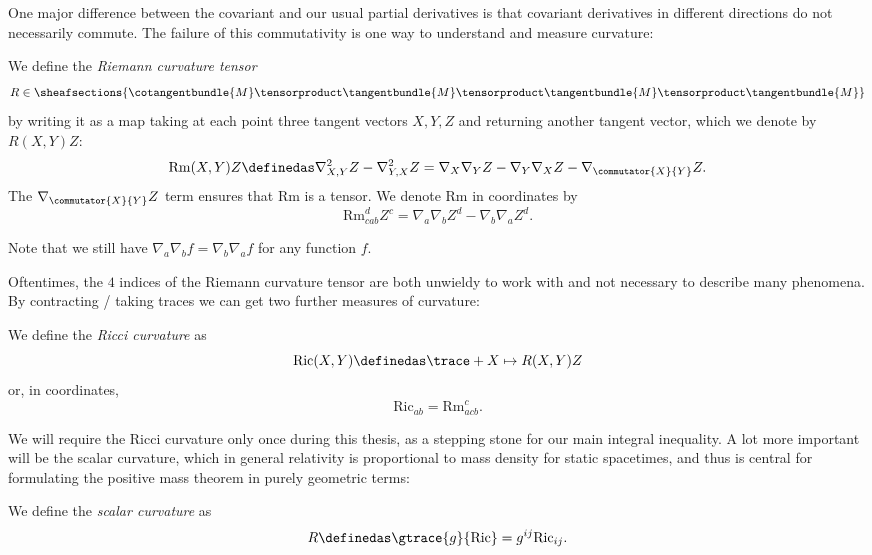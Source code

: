 \documentclass[titlepage,numbers=noenddot,oneside,%
cleardoublepage=empty,paper=a4,fontsize=11pt,%
english,%
]{scrartcl}
\newcommand{\Ricci}{\mathrm{Ric}} %
\newcommand{\riemanncurvature}{\mathrm{Rm}} %
\begin{document}
One major difference between the covariant and our usual partial derivatives is that covariant derivatives in different directions do not necessarily commute. The failure of this commutativity is one way to understand and measure curvature:
\begin{definition}\label{def:riemann_curvature_tensor}
    We define the \emph{Riemann curvature tensor} 
    \begin{equation*}
        R\in \sheafsections{\cotangentbundle{M}\tensorproduct \tangentbundle{M}\tensorproduct \tangentbundle{M}\tensorproduct \tangentbundle{M}}
    \end{equation*} 
    by writing it as a map taking at each point three tangent vectors \( X,Y,Z \) and returning another tangent vector, which we denote by \( R(X,Y)Z \):
    \begin{equation*}
        \riemanncurvature(X,Y)Z\definedas \nabla^2_{X,Y}Z-\nabla^2_{Y,X}Z=\nabla_X \nabla_Y Z- \nabla_Y \nabla_X Z -\nabla_{\commutator{X}{Y}}Z.
    \end{equation*}
    The \( \nabla_{\commutator{X}{Y}}Z \) term ensures that \(  \riemanncurvature \) is a tensor. We denote \(  \riemanncurvature \) in coordinates by
    \begin{equation*}
        \riemanncurvature^d_{cab}Z^c=\nabla_a \nabla_b Z^d-\nabla_b \nabla_a Z^d.
    \end{equation*}
\end{definition}
\begin{remark}\label{rem:second_derivatives_function_commute}
    Note that we still have \( \nabla_a \nabla_b f=\nabla_b \nabla_a f \) for any function \( f \).
\end{remark}
Oftentimes, the \( 4 \) indices of the Riemann curvature tensor are both unwieldy to work with and not necessary to describe many phenomena. By contracting / taking traces we can get two further measures of curvature:
\begin{definition}
    We define the \emph{Ricci curvature} as
    \begin{equation*}
        \Ricci(X,Y)\definedas\trace+{X\mapsto R(X,Y)Z}
    \end{equation*}
    or, in coordinates,
    \begin{equation*}
        \Ricci_{ab}=\riemanncurvature^c_{acb}.
    \end{equation*}
\end{definition}
We will require the Ricci curvature only once during this thesis, as a stepping stone for our main integral inequality. A lot more important will be the scalar curvature, which in general relativity is proportional to mass density for static spacetimes, and thus is central for formulating the positive mass theorem in purely geometric terms:
\begin{definition}
    We define the \emph{scalar curvature} as
    \begin{equation*}
        R\definedas \gtrace{g}{\Ricci}=g^{ij}\Ricci_{ij}.
    \end{equation*}
\end{definition}
\end{document}
